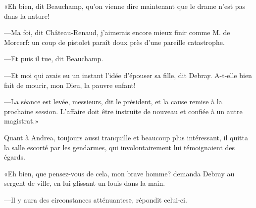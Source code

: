 «Eh bien, dit Beauchamp, qu'on vienne dire maintenant que le drame n'est pas dans la nature! 

—Ma foi, dit Château-Renaud, j'aimerais encore mieux finir comme M. de Morcerf: un coup de pistolet paraît doux près d'une pareille catastrophe. 

—Et puis il tue, dit Beauchamp. 

—Et moi qui avais eu un instant l'idée d'épouser sa fille, dit Debray. A-t-elle bien fait de mourir, mon Dieu, la pauvre enfant! 

—La séance est levée, messieurs, dit le président, et la cause remise à la prochaine session. L'affaire doit être instruite de nouveau et confiée à un autre magistrat.» 

Quant à Andrea, toujours aussi tranquille et beaucoup plus intéressant, il quitta la salle escorté par les gendarmes, qui involontairement lui témoignaient des égards. 

«Eh bien, que pensez-vous de cela, mon brave homme? demanda Debray au sergent de ville, en lui glissant un louis dans la main. 

—Il y aura des circonstances atténuantes», répondit celui-ci. 